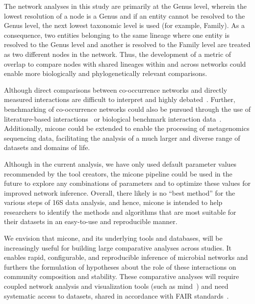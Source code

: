 \documentclass[letterpaper,12pt]{article}
\begin{document}
  The network analyses in this study are primarily at the Genus level, wherein the lowest resolution of a node is a Genus and if an entity cannot be resolved to the Genus level, the next lowest taxonomic level is used (for example, Family).
  As a consequence, two entities belonging to the same lineage where one entity is resolved to the Genus level and another is resolved to the Family level are treated as two different nodes in the network.
  Thus, the development of a metric of overlap to compare nodes with shared lineages within and across networks could enable more biologically and phylogenetically relevant comparisons.

  Although direct comparisons between co-occurrence networks and directly measured interactions are difficult to interpret and highly debated~\cite{hiranoDifficultyInferringMicrobial2019,gobernaCautionaryNotesUse2022}.
  Further, benchmarking of co-occurrence networks could also be pursued through the use of literature-based interactions~\cite{lima-mendezDeterminantsCommunityStructure2015a} or biological benchmark interaction data~\cite{sungGlobalMetabolicInteraction2017a}.
  Additionally, \ac{micone} could be extended to enable the processing of metagenomics sequencing data, facilitating the analysis of a much larger and diverse range of datasets and domains of life.

  Although in the current analysis, we have only used default parameter values recommended by the tool creators, the \ac{micone} pipeline could be used in the future to explore any combinations of parameters and to optimize these values for improved network inference.
  Overall, there likely is no ``best method'' for the various steps of 16S data analysis, and hence, \ac{micone} is intended to help researchers to identify the methods and algorithms that are most suitable for their datasets in an easy-to-use and reproducible manner.

  We envision that \ac{micone}, and its underlying tools and databases, will be increasingly useful for building large comparative analyses across studies.
  It enables rapid, configurable, and reproducible inference of microbial networks and furthers the formulation of hypotheses about the role of these interactions on community composition and stability.
  These comparative analyses will require coupled network analysis and visualization tools (such as \ac{mind}~\cite{huResourceComparisonIntegration2022}) and need systematic access to datasets, shared in accordance with FAIR standards~\cite{pachecoFAIRRepresentationsMicrobial2022}.
\end{document}
